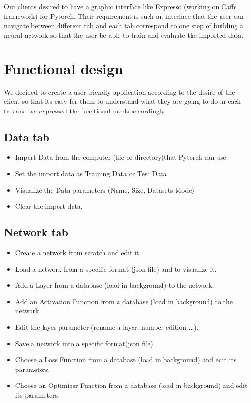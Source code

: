 Our clients desired to have a graphic interface like Expresso (working on Caffe framework) for Pytorch.
Their requirement is such an interface that the user can navigate between different tab and each tab correspond to one step of building a neural network so that the user be able to  train and evaluate the imported data.
\section{Functional design}


We decided to create a user friendly application according to the desire of the client so that its easy for them to understand what they are going to do in each tab and we expressed the functional needs accordingly.

\subsection{Data tab} 
    \begin{itemize}
        \item Import Data from the computer (file or directory)that Pytorch can use
        \item Set the import data as Training Data or Test Data
        \item Visualize the Data-parameters (Name, Size, Datasets Mode)
        \item Clear the import data.
    \end{itemize}
    
\subsection{Network tab} 
    \begin{itemize}
        \item Create a network from scratch and edit it.
        \item Load a network from a specific format (json file)  and to visualize it.
        \item Add a Layer from a database (load in background) to the network.
        \item Add an Activation Function from a database (load in background) to the network.
        \item Edit the layer parameter (rename a layer, number edition ...).
        \item Save a network into a specific format(json file).
        \item Choose a Loss Function from a database (load in background) and edit its parameters.
        \item Choose an Optimizer Function from a database (load in background) and edit its parameters.
    \end{itemize}
    
